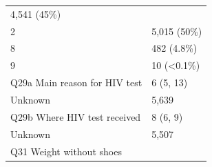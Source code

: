 \documentclass[]{article}
\begin{document}
\begin{longtable}[]{@{}ll@{}}
\begin{minipage}[t]{0.23\columnwidth}
4,541 (45\%)\strut
\end{minipage}\tabularnewline
\begin{minipage}[t]{0.71\columnwidth}\raggedright
2\strut
\end{minipage} & \begin{minipage}[t]{0.23\columnwidth}\raggedright
5,015 (50\%)\strut
\end{minipage}\tabularnewline
\begin{minipage}[t]{0.71\columnwidth}\raggedright
8\strut
\end{minipage} & \begin{minipage}[t]{0.23\columnwidth}\raggedright
482 (4.8\%)\strut
\end{minipage}\tabularnewline
\begin{minipage}[t]{0.71\columnwidth}\raggedright
9\strut
\end{minipage} & \begin{minipage}[t]{0.23\columnwidth}\raggedright
10 (\textless{}0.1\%)\strut
\end{minipage}\tabularnewline
\begin{minipage}[t]{0.71\columnwidth}\raggedright
Q29a Main reason for HIV test\strut
\end{minipage} & \begin{minipage}[t]{0.23\columnwidth}\raggedright
6 (5, 13)\strut
\end{minipage}\tabularnewline
\begin{minipage}[t]{0.71\columnwidth}\raggedright
Unknown\strut
\end{minipage} & \begin{minipage}[t]{0.23\columnwidth}\raggedright
5,639\strut
\end{minipage}\tabularnewline
\begin{minipage}[t]{0.71\columnwidth}\raggedright
Q29b Where HIV test received\strut
\end{minipage} & \begin{minipage}[t]{0.23\columnwidth}\raggedright
8 (6, 9)\strut
\end{minipage}\tabularnewline
\begin{minipage}[t]{0.71\columnwidth}\raggedright
Unknown\strut
\end{minipage} & \begin{minipage}[t]{0.23\columnwidth}\raggedright
5,507\strut
\end{minipage}\tabularnewline
\begin{minipage}[t]{0.71\columnwidth}\raggedright
Q31 Weight without shoes\strut

\end{minipage}
\end{longtable}
\end{document}
